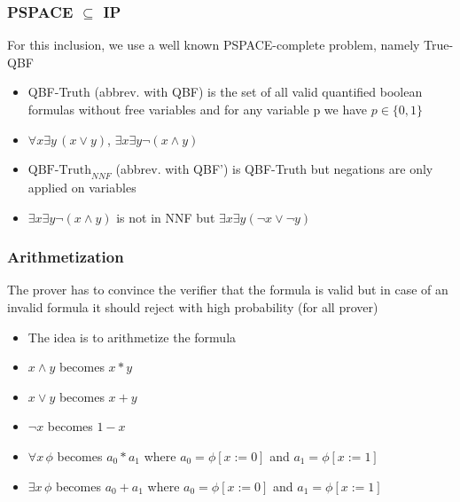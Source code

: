 \documentclass[hyperref={pdfpagelabels=false},t,10pt]{beamer}
\begin{document}
\begin{frame}
  \frametitle{PSPACE $\subseteq$ IP}
  For this inclusion, we use a well known PSPACE-complete problem, namely True-QBF
  \pause
  \begin{itemize}
  \item QBF-Truth (abbrev. with QBF) is the set of all valid quantified boolean formulas without free variables and for any variable p we have $p\in \{0,1\}$
  \pause
  \item $\forall x \exists y \, (x \lor y)$, $\exists x \exists y \neg(x \land y)$
  \pause
  \item $\mbox{QBF-Truth}_{NNF}$ (abbrev. with QBF') is QBF-Truth but negations are only applied on variables
  \item $\exists x \exists y \neg(x\land y)$ is not in NNF but $\exists x \exists y (\neg x \lor \neg y)$

  \end{itemize}
\end{frame}

\begin{frame}
  \frametitle{Arithmetization}
  The prover has to convince the verifier that the formula is valid but in case of 
  an invalid formula it should reject with high probability (for all prover) \newline \pause

  \begin{itemize}
    \item The idea is to arithmetize the formula \pause
    \item $x \land y$ becomes $x*y$
    \item $x \lor y$ becomes $x+y$
    \item $\neg x$ becomes $1-x$ \pause
    \item $\forall x \, \phi$ becomes $a_0 * a_1$ where $a_0 = \phi[x := 0]$ and $a_1 = \phi[x := 1]$ 
    \item $\exists x \, \phi$ becomes $a_0 + a_1$ where $a_0 = \phi[x := 0]$ and $a_1 = \phi[x := 1]$  
  \end{itemize}
\end{frame}
\end{document}

